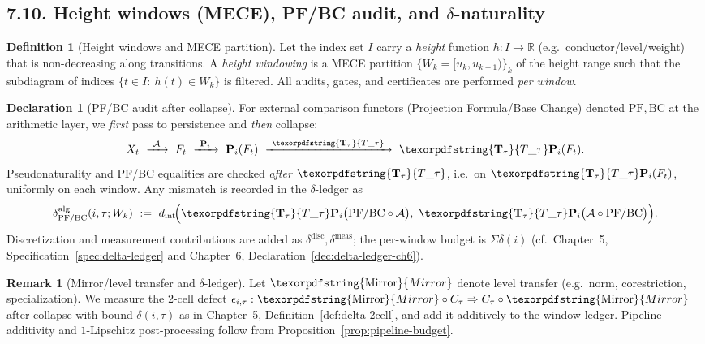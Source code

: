\documentclass[11pt]{article}
\DeclareRobustCommand{\hyp}{\nobreakdash-}
\numberwithin{equation}{section}
\theoremstyle{definition}
\newtheorem{definition}[theorem]{Definition}
\newtheorem{remark}[theorem]{Remark}
\newtheorem{declaration}[theorem]{Declaration}
\DeclareRobustCommand{\Ttau}{\texorpdfstring{\ensuremath{\mathbf{T}_{\tau}}}{T\_\tau}}
\DeclareRobustCommand{\Mirror}{\texorpdfstring{\ensuremath{\operatorname{Mirror}}}{Mirror}}
\begin{document}

\subsection*{7.10. Height windows (MECE), PF/BC audit, and $\delta$-naturality}
\begin{definition}[Height windows and MECE partition]\label{def:height-windows}
Let the index set \(I\) carry a \emph{height} function \(h:I\to \mathbb{R}\) (e.g.\ conductor/level/weight) that is non\hyp decreasing along transitions. A \emph{height windowing} is a MECE partition \(\{W_k=[u_k,u_{k+1})\}_k\) of the height range such that the subdiagram of indices \(\{t\in I:\ h(t)\in W_k\}\) is filtered. All audits, gates, and certificates are performed \emph{per window}.
\end{definition}

\begin{declaration}[PF/BC audit after collapse]\label{dec:pf-bc-audit}
For external comparison functors (Projection Formula/Base Change) denoted \(\mathrm{PF},\mathrm{BC}\) at the arithmetic layer, we \emph{first} pass to persistence and \emph{then} collapse:
\[
X_t\ \xrightarrow{\ \mathcal{A}\ }\ F_t\ \xrightarrow{\ \mathbf{P}_i\ }\ \mathbf{P}_i(F_t)\ \xrightarrow{\ \Ttau\ }\ \Ttau\mathbf{P}_i(F_t).
\]
Pseudonaturality and PF/BC equalities are checked \emph{after} \(\Ttau\), i.e.\ on \(\Ttau\mathbf{P}_i(F_t)\), uniformly on each window. Any mismatch is recorded in the \(\delta\)\hyp ledger as
\[
\delta^{\mathrm{alg}}_{\mathrm{PF/BC}}(i,\tau;W_k)\ :=\ d_{\mathrm{int}}\!\Big(\Ttau \mathbf{P}_i\big(\mathrm{PF/BC}\circ \mathcal{A}\big),\ \Ttau \mathbf{P}_i\big(\mathcal{A}\circ \mathrm{PF/BC}\big)\Big).
\]
Discretization and measurement contributions are added as \(\delta^{\mathrm{disc}},\delta^{\mathrm{meas}}\); the per\hyp window budget is \(\Sigma\delta(i)\) (cf.\ Chapter~5, Specification~\ref{spec:delta-ledger} and Chapter~6, Declaration~\ref{dec:delta-ledger-ch6}).
\end{declaration}

\begin{remark}[Mirror/level transfer and $\delta$-ledger]
Let \(\Mirror\) denote level transfer (e.g.\ norm, corestriction, specialization). We measure the $2$-cell defect \(\epsilon_{i,\tau}:\Mirror\circ C_\tau\Rightarrow C_\tau\circ \Mirror\) after collapse with bound \(\delta(i,\tau)\) as in Chapter~5, Definition~\ref{def:delta-2cell}, and add it additively to the window ledger. Pipeline additivity and $1$-Lipschitz post\hyp processing follow from Proposition~\ref{prop:pipeline-budget}.
\end{remark}
\end{document}

